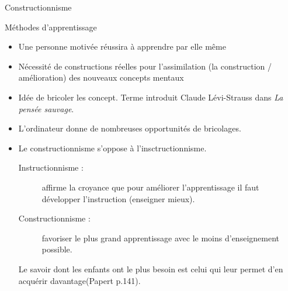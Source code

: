 \begin{frame}
\end{frame}

\begin{frame}{Constructionnisme}


\end{frame}

\begin{frame}{Méthodes d'apprentissage}
\begin{itemize}
  \item Une personne motivée réussira à apprendre par elle même
  \item Nécessité de constructions réelles pour l'assimilation (la construction / amélioration) des nouveaux concepts mentaux
  \item Idée de bricoler les concept. Terme introduit Claude Lévi-Strauss dans \textit{La pensée sauvage}. %
  \item L'ordinateur donne de nombreuses opportunités de bricolages.
  \item Le constructionnisme s'oppose à l'insctructionnisme.
  \begin{description}
    \item[Instructionnisme : ]affirme la croyance que pour améliorer l'apprentissage il faut développer l'instruction (enseigner mieux).
    \item[Constructionnisme : ]favoriser le plus grand apprentissage avec le moins d'enseignement possible.
    \end{description}
    \og{}Le savoir dont les enfants ont le plus besoin est celui qui leur permet d'en acquérir davantage\fg (Papert p.141).
\end{itemize}
\end{frame}

